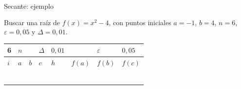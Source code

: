 \documentclass[original_version/main.tex]{subfiles}
\begin{document}
\begin{frame}[t]{Secante: ejemplo}
\begin{minipage}[t][13mm][t]{\textwidth}\small Buscar una raíz de $f(x)=x^2-4$, con puntos iniciales $a=-1$, $b=4$, $n=6$, $\varepsilon=0{,}05$ y $\Delta=0{,}01$.\end{minipage}\par{\scriptsize\setlength{\tabcolsep}{2pt}\renewcommand{\arraystretch}{1}\begin{center}\begin{tabular}{|C{.04\textwidth}|C{.112\textwidth}|C{.112\textwidth}|C{.112\textwidth}|C{.112\textwidth}|C{.112\textwidth}|C{.112\textwidth}|C{.112\textwidth}|}
\hline
\rule{0pt}{4.3mm}6 & $n$ &  &  $\Delta$  & $0{,}01$ &  & $\varepsilon$ & $0{,}05$\\\hline
\rule{0pt}{4.3mm}$i$ & $a$ & $b$ & $c$ & $h$ & $f(a)$ & $f(b)$ & $f(c)$\\\hline
\rule{0pt}{4.3mm} &  &  &  &  &  &  & \\\hline
\rule{0pt}{4.3mm} &  &  &  &  &  &  & \\\hline
\rule{0pt}{4.3mm} &  &  &  &  &  &  & \\\hline
\rule{0pt}{4.3mm} &  &  &  &  &  &  & \\\hline
\rule{0pt}{4.3mm} &  &  &  &  &  &  & \\\hline
\rule{0pt}{4.3mm} &  &  &  &  &  &  & \\\hline
\end{tabular}\end{center}}\begin{minipage}[t][10mm][t]{\textwidth}\footnotesize \end{minipage}
\end{frame}
\end{document}
